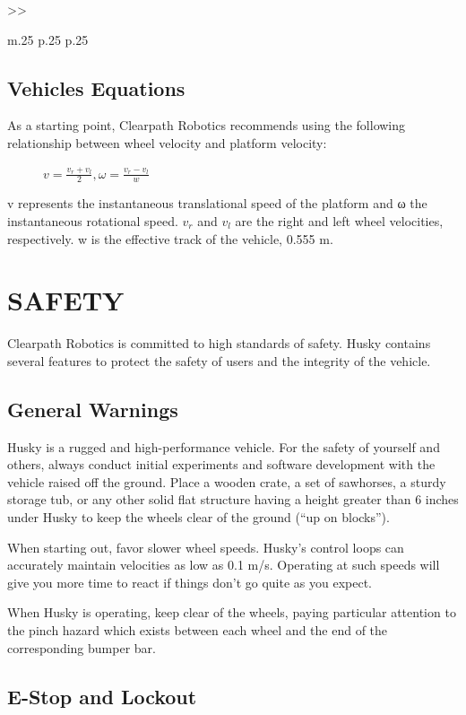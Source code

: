 \documentclass[]{clearpath-latex/clearpath-manual}
\begin{document}
\begin{table}[h]
\begin{tabular}{>{}>{\raggedright}m{.25\textwidth} p{.25\textwidth} p{.25\textwidth}}
	\end{tabular}
\newline
\caption{Husky A200 System Specifications}
\label{systemspecs}
\end{table}
\newpage
\subsection{Vehicles Equations}

As a starting point, Clearpath Robotics recommends using the following relationship between wheel velocity and platform velocity:
\begin{figure}[h]
\centering
$v=\frac{v_r+v_l}{2} , \omega=\frac{v_r-v_l}{w}  $
\end{figure}

v represents the instantaneous translational speed of the platform and ω the instantaneous rotational speed. $v_r$ and $v_l$ are 
the right and left wheel velocities, respectively. w is the effective track of the vehicle, 0.555 m.

\section{SAFETY}
Clearpath Robotics is committed to high standards of safety. Husky contains several features to protect the safety of users and the integrity of the vehicle.

\subsection{General Warnings}

Husky is a rugged and high-performance vehicle. For the safety of yourself and others, 
always conduct initial experiments and software development with the vehicle raised off the ground. 
Place a wooden crate, a set of sawhorses, a sturdy storage tub, or any other solid flat structure having a 
height greater than 6 inches under Husky to keep the wheels clear of the ground (“up on blocks”).

When starting out, favor slower wheel speeds. Husky’s control loops can accurately maintain velocities 
as low as 0.1 m/s. Operating at such speeds will give you more time to react if things don’t go quite as you expect.

When Husky is operating, keep clear of the wheels, paying particular attention to the pinch hazard which exists between each wheel and the end of the corresponding bumper bar.

\subsection{E-Stop and Lockout}
\end{document}
